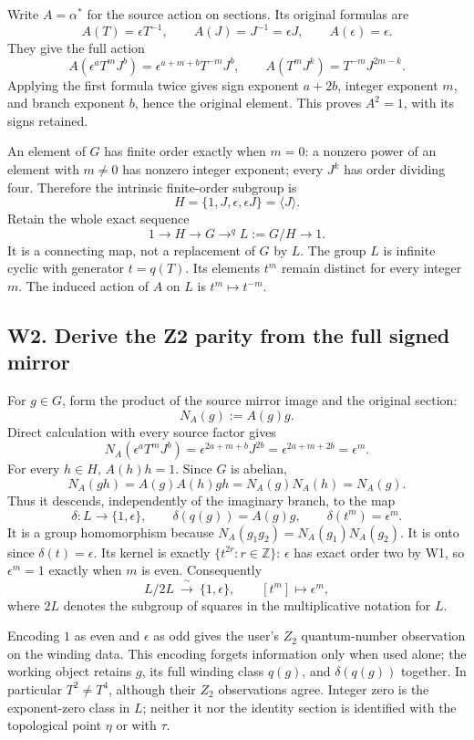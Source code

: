 \documentclass[
  11pt,
]{article}
\begin{document}
Write \(A=\alpha^*\) for the source action on sections. Its original
formulas are \[
A(T)=\epsilon T^{-1},\qquad A(J)=J^{-1}=\epsilon J,\qquad A(\epsilon)=\epsilon.
\] They give the full action \[
A(\epsilon^aT^mJ^b)=\epsilon^{a+m+b}T^{-m}J^b,
\qquad
A(T^mJ^k)=T^{-m}J^{2m-k}.
\] Applying the first formula twice gives sign exponent \(a+2b\),
integer exponent \(m\), and branch exponent \(b\), hence the original
element. This proves \(A^2=1\), with its signs retained.

An element of \(G\) has finite order exactly when \(m=0\): a nonzero
power of an element with \(m\ne0\) has nonzero integer exponent; every
\(J^k\) has order dividing four. Therefore the intrinsic finite-order
subgroup is \[
H=\{1,J,\epsilon,\epsilon J\}=\langle J\rangle.
\] Retain the whole exact sequence \[
1\longrightarrow H\longrightarrow G\mathrel{\mathop{\longrightarrow}^{q}}L:=G/H\longrightarrow1.
\] It is a connecting map, not a replacement of \(G\) by \(L\). The
group \(L\) is infinite cyclic with generator \(t=q(T)\). Its elements
\(t^m\) remain distinct for every integer \(m\). The induced action of
\(A\) on \(L\) is \(t^m\mapsto t^{-m}\).

\subsection{W2. Derive the Z2 parity from the full signed
mirror}\label{w2.-derive-the-z2-parity-from-the-full-signed-mirror}

For \(g\in G\), form the product of the source mirror image and the
original section: \[
N_A(g):=A(g)g.
\] Direct calculation with every source factor gives \[
N_A(\epsilon^aT^mJ^b)
=\epsilon^{2a+m+b}J^{2b}
=\epsilon^{2a+m+2b}
=\epsilon^m.
\] For every \(h\in H\), \(A(h)h=1\). Since \(G\) is abelian, \[
N_A(gh)=A(g)A(h)gh=N_A(g)N_A(h)=N_A(g).
\] Thus it descends, independently of the imaginary branch, to the map
\[
\delta:L\longrightarrow\{1,\epsilon\},\qquad
\delta(q(g))=A(g)g,
\qquad
\boxed{\delta(t^m)=\epsilon^m.}
\] It is a group homomorphism because \(N_A(g_1g_2)=N_A(g_1)N_A(g_2)\).
It is onto since \(\delta(t)=\epsilon\). Its kernel is exactly
\(\{t^{2r}:r\in\mathbb Z\}\): \(\epsilon\) has exact order two by W1, so
\(\epsilon^m=1\) exactly when \(m\) is even. Consequently \[
L/2L\ \xrightarrow{\ \sim\ }\ \{1,\epsilon\},
\qquad
[t^m]\longmapsto\epsilon^m,
\] where \(2L\) denotes the subgroup of squares in the multiplicative
notation for \(L\).

Encoding \(1\) as even and \(\epsilon\) as odd gives the user's \(Z_2\)
quantum-number observation on the winding data. This encoding forgets
information only when used alone; the working object retains \(g\), its
full winding class \(q(g)\), and \(\delta(q(g))\) together. In
particular \(T^2\ne T^4\), although their \(Z_2\) observations agree.
Integer zero is the exponent-zero class in \(L\); neither it nor the
identity section is identified with the topological point \(\eta\) or
with \(\tau\).
\end{document}
